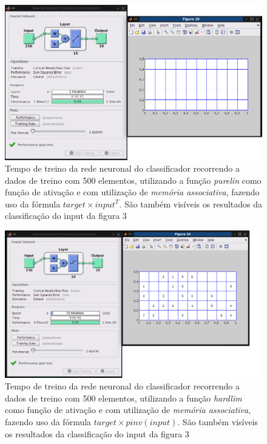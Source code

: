 \documentclass{article}
\begin{document}
\begin{figure}[h]
  \centering
      \includegraphics[scale=0.3]{500_Transpose_Linear.png}
  \caption{Tempo de treino da rede neuronal do classificador recorrendo a dados de treino com 500 elementos, utilizando a função \emph{purelin} como função de ativação e com utilização de \emph{memória associativa}, fazendo uso da fórmula $target\times input^T$. São também visíveis os resultados da classificação do input da figura 3}
\end{figure}

\begin{figure}[h]
  \centering
      \includegraphics[scale=0.3]{500_Pinv_Hardlim.png}
  \caption{Tempo de treino da rede neuronal do classificador recorrendo a dados de treino com 500 elementos, utilizando a função \emph{hardlim} como função de ativação e com utilização de \emph{memória associativa}, fazendo uso da fórmula $target\times pinv(input)$. São também visíveis os resultados da classificação do input da figura 3}
\end{figure}
\end{document}
